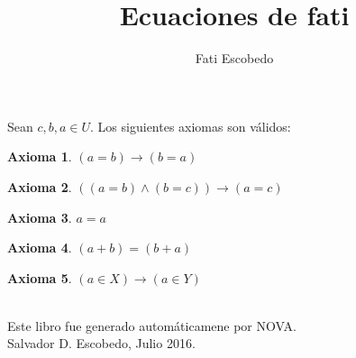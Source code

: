 ﻿\documentclass[12pt]{book}
\title{Ecuaciones de fati}
\author{Fati Escobedo}
\date{}
\newtheorem{axiom}{Axioma}[chapter]
\begin{document}
\maketitle

Sean $c,b,a\in U$. 
Los siguientes axiomas son válidos: 
\begin{axiom}
$(a=b)\rightarrow (b=a)$
\end{axiom}
\begin{axiom}
$((a=b)\wedge (b=c))\rightarrow (a=c)$
\end{axiom}
\begin{axiom}
$a=a$
\end{axiom}
\begin{axiom}
$(a+b)=(b+a)$
\end{axiom}
\begin{axiom}
$(a\in X)\rightarrow (a\in Y)$
\end{axiom}
\label{ax: 0}
\\\small{Este libro fue generado automáticamene por NOVA.} \\
\small{Salvador D. Escobedo, Julio 2016}.
\end{document}
